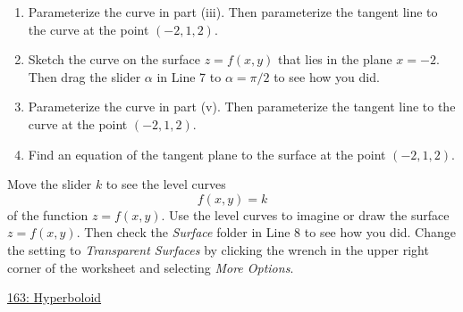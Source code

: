 \documentclass{ximera}
\begin{document}
\begin{example}
\begin{enumerate}
\begin{enumerate}
\item Parameterize the curve in part (iii). Then parameterize the tangent line to the curve at the point $(-2,1,2)$.



\item Sketch the curve on the surface $z=f(x,y)$ that lies in the plane $x=-2$. Then drag the slider $\alpha$ in Line 7 to $\alpha = \pi/2$ to see how you did.

\item Parameterize the curve in part (v). Then parameterize the tangent line to the curve at the point $(-2,1,2)$.

\item Find an equation of the tangent plane to the surface at the point $(-2,1,2)$.

\end{enumerate}
\end{enumerate}
\end{example}



\begin{example}  \label{Ed4fgvvvvf45}
Move the slider $k$ to see the level curves 
\[
    f(x,y)=k
\]
of the function $z=f(x,y)$. Use the level curves to imagine or draw the surface $z=f(x,y)$. Then check the \emph{Surface} folder in Line 8 to see how you did. Change the setting to \emph{Transparent Surfaces} by clicking the wrench in the upper right corner of the worksheet and selecting \emph{More Options}.


 
\begin{onlineOnly}
    \begin{center}
\end{center}
\end{onlineOnly}


 
\href{https://www.desmos.com/3d/yj0kpv4zmi}{163: Hyperboloid}
\end{example}
\end{document}
